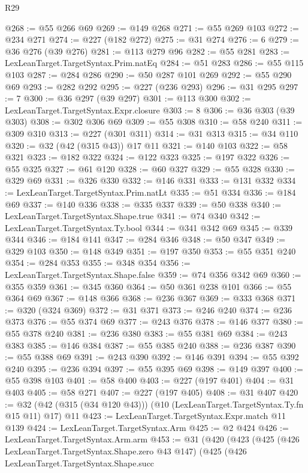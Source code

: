 \begin{lexlean}{R29}
\begin{coremodule}
@268 := @55 @266 @69
@269 := @149 @268
@271 := @55 @269 @103
@272 := @234 @271
@274 := @227 (@182 @272)
@275 := @31 @274
@276 := 6
@279 := @36 @276 (@39 @276)
@281 := @113 @279 @96
@282 := @55 @281
@283 := LexLeanTarget.TargetSyntax.Prim.natEq
@284 := @51 @283
@286 := @55 @115 @103
@287 := @284 @286
@290 := @50 @287 @101 @269
@292 := @55 @290 @69
@293 := @282 @292
@295 := @227 (@236 @293)
@296 := @31 @295
@297 := 7
@300 := @36 @297 (@39 @297)
@301 := @113 @300
@302 := LexLeanTarget.TargetSyntax.Expr.closure
@303 := 8
@306 := @36 @303 (@39 @303)
@308 := @302 @306 @69
@309 := @55 @308
@310 := @58 @240
@311 := @309 @310
@313 := @227 (@301 @311)
@314 := @31 @313
@315 := @34 @110
@320 := @32 (@42 (@315 @43)) @17 @11
@321 := @140 @103
@322 := @58 @321
@323 := @182 @322
@324 := @122 @323
@325 := @197 @322
@326 := @55 @325
@327 := @61 @120
@328 := @60 @327
@329 := @55 @328
@330 := @329 @69
@331 := @326 @330
@332 := @146 @331
@333 := @131 @332
@334 := LexLeanTarget.TargetSyntax.Prim.natLt
@335 := @51 @334
@336 := @184 @69
@337 := @140 @336
@338 := @335 @337
@339 := @50 @338
@340 := LexLeanTarget.TargetSyntax.Shape.true
@341 := @74 @340
@342 := LexLeanTarget.TargetSyntax.Ty.bool
@344 := @341 @342 @69
@345 := @339 @344
@346 := @184 @141
@347 := @284 @346
@348 := @50 @347
@349 := @329 @103
@350 := @148 @349
@351 := @197 @350
@353 := @55 @351 @240
@354 := @284 @353
@355 := @348 @354
@356 := LexLeanTarget.TargetSyntax.Shape.false
@359 := @74 @356 @342 @69
@360 := @355 @359
@361 := @345 @360
@364 := @50 @361 @238 @101
@366 := @55 @364 @69
@367 := @148 @366
@368 := @236 @367
@369 := @333 @368
@371 := @320 (@324 @369)
@372 := @31 @371
@373 := @246 @240
@374 := @236 @373
@376 := @55 @374 @69
@377 := @243 @376
@378 := @146 @377
@380 := @55 @378 @240
@381 := @236 @380
@383 := @55 @381 @69
@384 := @243 @383
@385 := @146 @384
@387 := @55 @385 @240
@388 := @236 @387
@390 := @55 @388 @69
@391 := @243 @390
@392 := @146 @391
@394 := @55 @392 @240
@395 := @236 @394
@397 := @55 @395 @69
@398 := @149 @397
@400 := @55 @398 @103
@401 := @58 @400
@403 := @227 (@197 @401)
@404 := @31 @403
@405 := @58 @271
@407 := @227 (@197 @405)
@408 := @31 @407
@420 := @32 (@42 (@315 (@34 @120 @43))) (@10 (LexLeanTarget.TargetSyntax.Ty.fn @15 @11) @17) @11
@423 := LexLeanTarget.TargetSyntax.Expr.match @11 @139
@424 := LexLeanTarget.TargetSyntax.Arm
@425 := @2 @424
@426 := LexLeanTarget.TargetSyntax.Arm.arm
@453 := @31
    (@420
      (@423
        (@425
          (@426 LexLeanTarget.TargetSyntax.Shape.zero @43 @147)
          (@425
            (@426
              LexLeanTarget.TargetSyntax.Shape.succ

\end{coremodule}
\end{lexlean}
